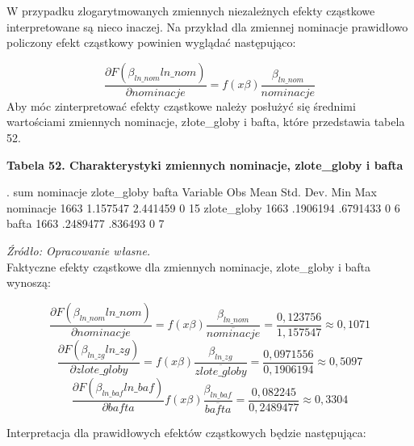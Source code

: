 W przypadku zlogarytmowanych zmiennych niezależnych efekty cząstkowe interpretowane są nieco inaczej. Na przykład dla zmiennej nominacje prawidłowo policzony efekt cząstkowy powinien wyglądać następująco:

\begin{equation}
\frac{\partial F(\beta_{ln\_nom}ln\_nom)}{\partial nominacje}=f(x\beta)\frac{\beta_{ln\_nom}}{nominacje}
\end{equation} 
\vspace{0.5cm}
Aby móc zinterpretować efekty cząstkowe należy posłużyć się średnimi wartościami zmiennych nominacje, złote_globy i bafta, które przedstawia tabela 52.

\vspace{0.5cm}
\textbf{Tabela 52. Charakterystyki zmiennych nominacje, zlote_globy i bafta}
\begin{stlog}
. sum nominacje zlote_globy bafta
{\smallskip}
    Variable {\VBAR}       Obs        Mean    Std. Dev.       Min        Max
   nominacje {\VBAR}      1663    1.157547    2.441459          0         15
 zlote_globy {\VBAR}      1663    .1906194    .6791433          0          6
       bafta {\VBAR}      1663    .2489477     .836493          0          7
\end{stlog}
\textit{\footnotesize{Źródło: Opracowanie własne.}} \\

Faktyczne efekty cząstkowe dla zmiennych nominacje, zlote_globy i bafta wynoszą:

\begin{equation}
\frac{\partial F(\beta_{ln\_nom}ln\_nom)}{\partial nominacje}=f(x\beta)\frac{\beta_{ln\_nom}}{\overline{nominacje}}= \frac{0,123756}{1,157547}\approx 0,1071
\end{equation}
\begin{equation}
\frac{\partial F(\beta_{ln\_zg}ln\_zg)}{\partial zlote\_globy}=f(x\beta)\frac{\beta_{ln\_zg}}{\overline{zlote\_globy}}= \frac{0,0971556}{0,1906194}\approx 0,5097
\end{equation}
\begin{equation}
\frac{\partial F(\beta_{ln\_baf}ln\_baf)}{\partial bafta}f(x\beta)\frac{\beta_{ln\_baf}}{\overline{bafta}}= \frac{0,082245}{0,2489477}\approx 0,3304 
\end{equation}
\vspace{1cm}

Interpretacja dla prawidłowych efektów cząstkowych będzie następująca: 

